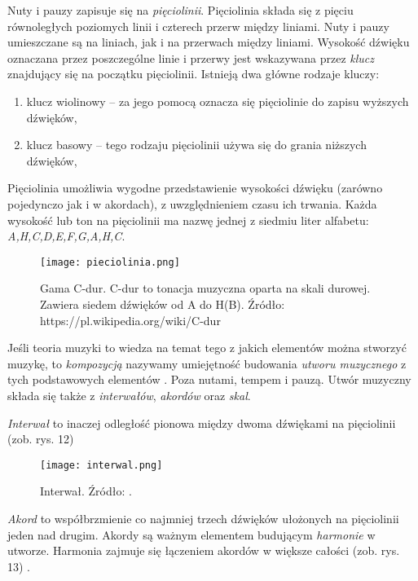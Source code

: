 Nuty i pauzy zapisuje się na \textit{pięciolinii}. Pięciolinia składa się z pięciu równoległych poziomych linii i czterech przerw między liniami. Nuty i pauzy umieszczane są na liniach, jak i na przerwach między liniami. Wysokość dźwięku oznaczana przez poszczególne linie i przerwy jest wskazywana przez \textit{klucz} znajdujący się na początku pięciolinii. Istnieją dwa główne rodzaje kluczy:
\begin{enumerate}
    \item klucz wiolinowy -- za jego pomocą oznacza się pięciolinie do zapisu wyższych dźwięków,
    \item klucz basowy -- tego rodzaju pięciolinii używa się do grania niższych dźwięków,
\end{enumerate}

Pięciolinia umożliwia wygodne przedstawienie wysokości dźwięku (zarówno pojedynczo jak i w akordach), z uwzględnieniem czasu ich trwania.
 Każda wysokość lub ton na pięciolinii ma nazwę jednej z siedmiu liter alfabetu: \textit{A,H,C,D,E,F,G,A,H,C}.
 
 \begin{figure}[H]
\texttt{[image: pieciolinia.png]}
\centering
\caption{Gama C-dur. C-dur to tonacja muzyczna oparta na skali durowej. Zawiera siedem dźwięków od A do H(B). Źródło: https://pl.wikipedia.org/wiki/C-dur}
\centering
\end{figure}

Jeśli teoria muzyki to wiedza na temat tego z jakich elementów można stworzyć muzykę, to \textit{kompozycją} nazywamy umiejętność budowania \textit{utworu muzycznego} z tych podstawowych elementów \citep[s. 22]{Usarzewicz2018}.
Poza nutami, tempem i pauzą. Utwór muzyczny składa się także z \textit{interwałów}, \textit{akordów} oraz \textit{skal}.

\textit{Interwał} to inaczej odległość pionowa między dwoma dźwiękami na pięciolinii (zob. rys. 12) 

 \begin{figure}[H]
 \centering
\texttt{[image: interwal.png]}
\caption{Interwał. Źródło: \citep[s. 22]{Usarzewicz2018}.}
\centering
\end{figure}

\textit{Akord} to współbrzmienie co najmniej trzech dźwięków ułożonych na pięciolinii jeden nad drugim. Akordy są ważnym elementem budującym \textit{harmonie} w utworze. Harmonia zajmuje się łączeniem akordów w większe całości (zob. rys. 13) \citep[s. 23]{Usarzewicz2018}.

